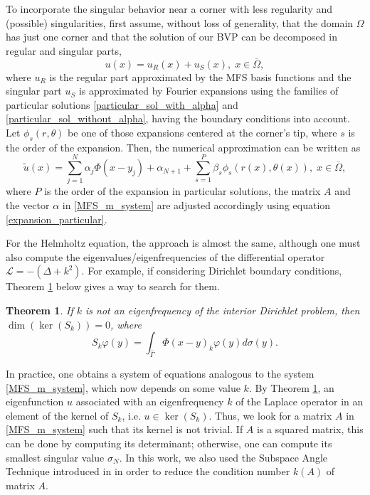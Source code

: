 \documentclass[5p,authoryear]{elsarticle}
\newtheorem{theorem}{Theorem}[subsection]
\begin{document}
To incorporate the singular behavior near a corner with less regularity and (possible) singularities, first assume, without loss of generality, that the domain \(\Omega\) has just one corner and that the solution of our BVP can be decomposed in regular and singular parts,
\[
    u(x) = u_R(x) + u_S(x), \; x \in \overline{\Omega},
\]
where \(u_R\) is the regular part approximated by the MFS basis functions and the singular part \(u_S\) is approximated by Fourier expansions using the families of particular solutions \eqref{particular_sol_with_alpha} and \eqref{particular_sol_without_alpha}, having the boundary conditions into account. Let \(\phi_s(r, \theta)\) be one of those expansions centered at the corner's tip, where \(s\) is the order of the expansion. Then, the numerical approximation can be written as
\begin{equation}\label{expansion_particular}
    \tilde{u}(x) = \sum_{j=1}^{N}\alpha_j \Phi(x-y_j) + \alpha_{N+1} + \sum_{s=1}^{P} \beta_s \phi_s(r(x),\theta(x)), \; x \in \overline{\Omega},
\end{equation}
where \(P\) is the order of the expansion in particular solutions, the matrix \(A\) and the vector \(\alpha\) in \eqref{MFS_m_system} are adjusted accordingly using equation \eqref{expansion_particular}.

For the Helmholtz equation, the approach is almost the same, although one must also compute the \sloppy eigenvalues/eigenfrequencies of the differential operator \(\mathcal{L} = -(\Delta + k^2)\). For example, if considering Dirichlet boundary conditions, Theorem \ref{MFS_helm_null_kern} below gives a way to search for them.
\begin{theorem}\label{MFS_helm_null_kern}
    If \(k\) is not an eigenfrequency of the interior Dirichlet problem, then \(\dim \left(\ker(S_k)\right)=0\), where
    \[
    S_k \varphi(y) = \int_{\hat{\Gamma}}\Phi(x-y)_k\varphi(y)d\sigma(y).
    \]
\end{theorem}

In practice, one obtains a system of equations analogous to the system \eqref{MFS_m_system}, which now depends on some value \(k\). By Theorem \ref{MFS_helm_null_kern}, an eigenfunction \(u\) associated with an eigenfrequency \(k\) of the Laplace operator in an element of the kernel of \(S_k\), i.e. \(u \in \ker(S_k)\). Thus, we look for a matrix \(A\) in \eqref{MFS_m_system} such that its kernel is not trivial. If \(A\) is a squared matrix, this can be done by computing its determinant; otherwise, one can compute its smallest singular value \(\sigma_N\). In this work, we also used the Subspace Angle Technique introduced in \cite{betcke2005reviving} in order to reduce the condition number \(k(A)\) of matrix \(A\).
\end{document}
